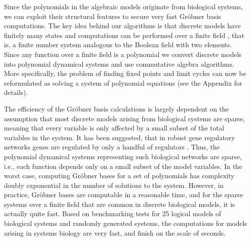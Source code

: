 \documentclass[11pt]{amsart}
\begin{document}
%
%
%
 
Since the polynomials in the algebraic
models originate from biological systems, we can exploit their structural
features to secure very fast Gr\"obner basis computations.
The key idea behind our algorithms is that discrete models have finitely many states and computations
can be performed over a finite field \cite{Alan:Bioinf2010,
Hinkelmann:2010}, that is, a finite number system analogous to the Boolean field with two elements.
Since any function over a finite field is a polynomial
\cite{Lidl:1997} we convert discrete models into polynomial dynamical systems
and use commutative algebra algorithms. More specifically, the problem of finding fixed points and limit cycles
can now be reformulated as solving a system of polynomial equations (see the Appendix for details).
 
The efficiency of the Gr\"obner basis calculations is largely dependent on the
assumption that most discrete models arising from biological systems are
sparse, meaning that every variable is only affected by a small subset of the
total variables in the system. It has been suggested, that in robust gene
regulatory networks genes are regulated by only a handful of regulators
\cite{Leclerc:2008}. Thus, the polynomial dynamical systems representing such biological networks are
sparse, i.e., each function depends only on a small subset of the model variables.
In the worst case, computing Gr\"obner bases for a set of polynomials has
complexity doubly exponential in the number of solutions to the system.
However, in practice, Gr\"{o}bner bases are computable in a reasonable time, and
for the sparse systems over a finite field that are common in discrete
biological models, it is actually quite fast.
Based on benchmarking tests for
25 logical models of biological systems \cite{GINsimRepo}
and randomly generated systems,
the computations for models arising in systems biology are very fast, and finish on the scale of
seconds.
\end{document}
